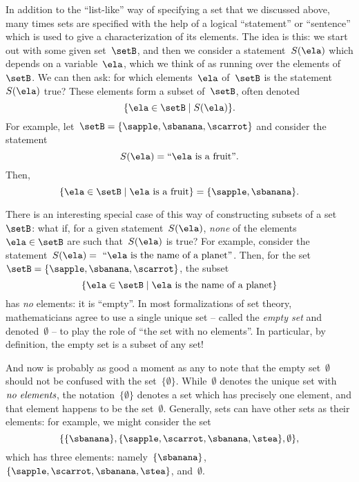 In addition to the ``list-like'' way of specifying a set that we discussed above, many times sets are specified with the help of a logical ``statement'' or ``sentence'' which is used to give a characterization of its elements.
The idea is this: we start out with some given set~$\setB$, and then we consider a statement~$S(\ela)$ which depends on a variable~$\ela$, which we think of as running over the elements of~$\setB$.
We can then ask: for which elements~$\ela$ of~$\setB$ is the statement~$S(\ela)$ true?
These elements form a subset of~$\setB$, often denoted
\begin{equation}
    \label{eq:axiom-specialization}
    \{ \ela \in \setB \mid S(\ela) \}.
\end{equation}
For example, let~$\setB = \{ \sapple, \sbanana, \scarrot \}$ and consider the statement
\begin{equation*}
    S(\ela) = \text{``} \ela \text{ is a fruit''}.
\end{equation*}
Then,
\begin{equation*}
    \{ \ela \in \setB \mid \ela \text{ is a fruit} \} = \{ \sapple, \sbanana \}.
\end{equation*}

There is an interesting special case of this way of constructing subsets of a set~$\setB$:
what if, for a given statement~$S(\ela)$, \emph{none} of the elements~$\ela \in \setB$ are such that~$S(\ela)$ is true?
For example, consider the statement~$S(\ela) =\text{ ``} \ela \text{ is the name of a planet''}$.
Then, for the set~$\setB = \{ \sapple, \sbanana, \scarrot \}$, the subset
\begin{equation*}
    \{ \ela \in \setB \mid \ela \text{ is the name of a planet} \}
\end{equation*}
has \emph{no} elements: it is ``empty''.
In most formalizations of set theory, mathematicians agree to use a single unique set -- called the \emph{empty set} and denoted~$\emptyset$ -- to play the role of ``the set with no elements''.
In particular, by definition, the empty set is a subset of any set!

And now is probably as good a moment as any to note that the empty set~$\emptyset$ should not be confused with the set~$\{ \emptyset \}$.
While~$\emptyset$ denotes the unique set with~$\emph{no elements}$, the notation~$\{ \emptyset \}$ denotes a set which has precisely one element, and that element happens to be the set~$\emptyset$.
Generally, sets can have other sets as their elements: for example, we might consider the set
\begin{equation*}
    \{ \{ \sbanana \}, \{ \sapple, \scarrot, \sbanana, \stea \}, \emptyset \},
\end{equation*}
which has three elements: namely~$\{ \sbanana \}$,~$\{ \sapple, \scarrot, \sbanana, \stea \}$, and~$\emptyset$.

